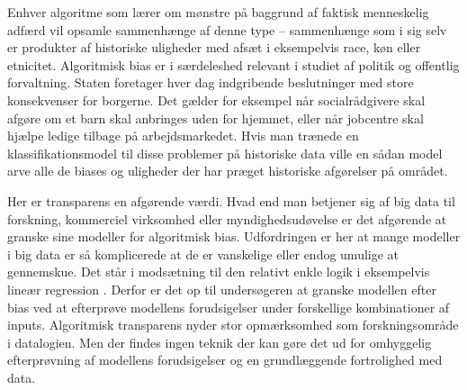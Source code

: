 \documentclass[12pt,]{article}
\begin{document}
Enhver algoritme som lærer om mønstre på baggrund af faktisk menneskelig
adfærd vil opsamle sammenhænge af denne type -- sammenhænge som i sig
selv er produkter af historiske uligheder med afsæt i eksempelvis race,
køn eller etnicitet. Algoritmisk bias er i særdeleshed relevant i
studiet af politik og offentlig forvaltning. Staten foretager hver dag
indgribende beslutninger med store konsekvenser for borgerne. Det gælder
for eksempel når socialrådgivere skal afgøre om et barn skal anbringes
uden for hjemmet, eller når jobcentre skal hjælpe ledige tilbage på
arbejdsmarkedet. Hvis man trænede en klassifikationsmodel til disse
problemer på historiske data ville en sådan model arve alle de biases og
uligheder der har præget historiske afgørelser på området.

Her er transparens en afgørende værdi. Hvad end man betjener sig af big
data til forskning, kommerciel virksomhed eller myndighedsudøvelse er
det afgørende at granske sine modeller for algoritmisk bias.
Udfordringen er her at mange modeller i big data er så komplicerede at
de er vanskelige eller endog umulige at gennemskue. Det står i
modsætning til den relativt enkle logik i eksempelvis lineær regression
\citep{blackbox}. Derfor er det op til undersøgeren at granske modellen
efter bias ved at efterprøve modellens forudsigelser under forskellige
kombinationer af inputs. Algoritmisk transparens nyder stor opmærksomhed
som forskningsområde i datalogien. Men der findes ingen teknik der kan
gøre det ud for omhyggelig efterprøvning af modellens forudsigelser og
en grundlæggende fortrolighed med data.


\end{document}

